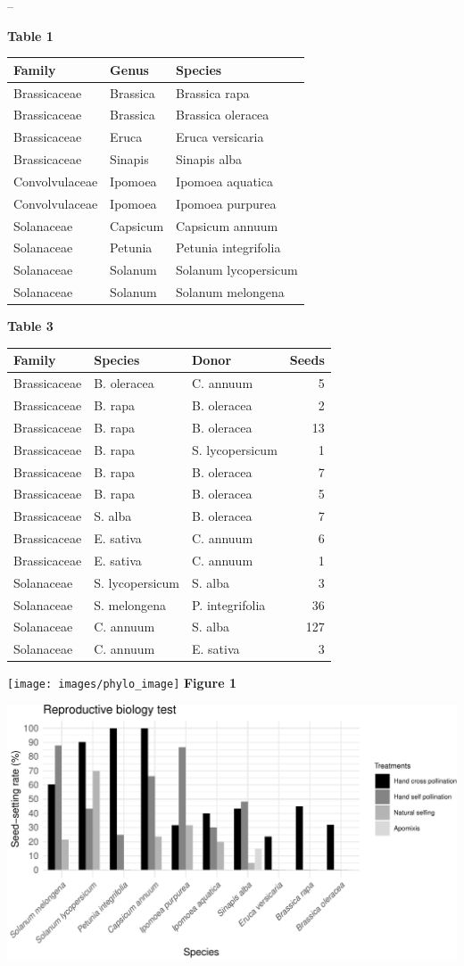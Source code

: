 \documentclass[]{article}
\title{}
\author{}
\date{}
\begin{document}
--

\textbf{Table 1}

\begin{longtable}[]{@{}lll@{}}
\toprule
Family & Genus & Species\tabularnewline
\midrule
\endhead
Brassicaceae & Brassica & Brassica rapa\tabularnewline
Brassicaceae & Brassica & Brassica oleracea\tabularnewline
Brassicaceae & Eruca & Eruca versicaria\tabularnewline
Brassicaceae & Sinapis & Sinapis alba\tabularnewline
Convolvulaceae & Ipomoea & Ipomoea aquatica\tabularnewline
Convolvulaceae & Ipomoea & Ipomoea purpurea\tabularnewline
Solanaceae & Capsicum & Capsicum annuum\tabularnewline
Solanaceae & Petunia & Petunia integrifolia\tabularnewline
Solanaceae & Solanum & Solanum lycopersicum\tabularnewline
Solanaceae & Solanum & Solanum melongena\tabularnewline
\bottomrule
\end{longtable}

\newpage

\newpage

\textbf{Table 3}

\begin{longtable}[]{@{}lllr@{}}
\toprule
Family & Species & Donor & Seeds\tabularnewline
\midrule
\endhead
Brassicaceae & B. oleracea & C. annuum & 5\tabularnewline
Brassicaceae & B. rapa & B. oleracea & 2\tabularnewline
Brassicaceae & B. rapa & B. oleracea & 13\tabularnewline
Brassicaceae & B. rapa & S. lycopersicum & 1\tabularnewline
Brassicaceae & B. rapa & B. oleracea & 7\tabularnewline
Brassicaceae & B. rapa & B. oleracea & 5\tabularnewline
Brassicaceae & S. alba & B. oleracea & 7\tabularnewline
Brassicaceae & E. sativa & C. annuum & 6\tabularnewline
Brassicaceae & E. sativa & C. annuum & 1\tabularnewline
Solanaceae & S. lycopersicum & S. alba & 3\tabularnewline
Solanaceae & S. melongena & P. integrifolia & 36\tabularnewline
Solanaceae & C. annuum & S. alba & 127\tabularnewline
Solanaceae & C. annuum & E. sativa & 3\tabularnewline
\bottomrule
\end{longtable}

\newpage

\texttt{[image: images/phylo\_image]} \textbf{Figure
1} \newpage

\begin{center}\includegraphics{output/figures/unnamed-chunk-4-1} \end{center}
\end{document}
